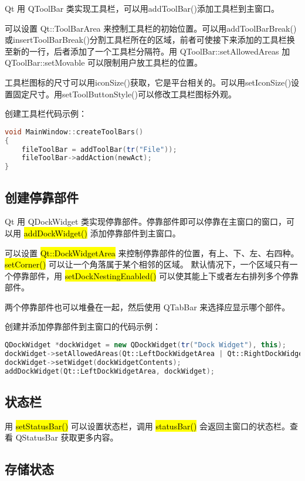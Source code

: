 Qt 用 QToolBar 类实现工具栏，可以用addToolBar()添加工具栏到主窗口。

可以设置 Qt::ToolBarArea 来控制工具栏的初始位置。可以用addToolBarBreak()或insertToolBarBreak()分割工具栏所在的区域，前者可使接下来添加的工具栏换至新的一行，后者添加了一个工具栏分隔符。用 QToolBar::setAllowedAreas 加 QToolBar::setMovable 可以限制用户放工具栏的位置。

工具栏图标的尺寸可以用iconSize()获取，它是平台相关的。可以用setIconSize()设置固定尺寸。用setToolButtonStyle()可以修改工具栏图标外观。

创建工具栏代码示例：

\begin{lstlisting}[language=C++]
void MainWindow::createToolBars()
{
    fileToolBar = addToolBar(tr("File"));
    fileToolBar->addAction(newAct);
}
\end{lstlisting}

\subsection{创建停靠部件}

Qt 用 QDockWidget 类实现停靠部件。停靠部件即可以停靠在主窗口的窗口，可以用 \hl{addDockWidget()} 添加停靠部件到主窗口。

可以设置 \hl{Qt::DockWidgetArea} 来控制停靠部件的位置，有上、下、左、右四种。\hl{setCorner()} 可以让一个角落属于某个相邻的区域。
默认情况下，一个区域只有一个停靠部件，用 \hl{setDockNestingEnabled()} 可以使其能上下或者左右排列多个停靠部件。

两个停靠部件也可以堆叠在一起，然后使用 QTabBar 来选择应显示哪个部件。

创建并添加停靠部件到主窗口的代码示例：


\begin{lstlisting}[language=C++]
QDockWidget *dockWidget = new QDockWidget(tr("Dock Widget"), this);
dockWidget->setAllowedAreas(Qt::LeftDockWidgetArea | Qt::RightDockWidgetArea);
dockWidget->setWidget(dockWidgetContents);
addDockWidget(Qt::LeftDockWidgetArea, dockWidget);
\end{lstlisting}

\subsection{状态栏}

用 \hl{setStatusBar()} 可以设置状态栏，调用 \hl{statusBar()} 会返回主窗口的状态栏。查看 QStatusBar 获取更多内容。

\subsection{存储状态}

